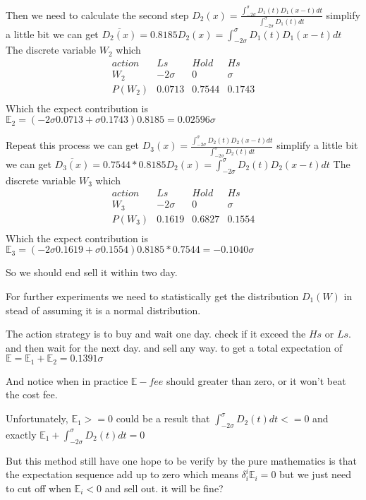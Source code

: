 \documentclass{article}
\theoremstyle{definition} %
\begin{document}
Then we need to calculate the second step
$D_2(x)=
    \frac{\int_{-2\sigma}^{\sigma}D_1(t)D_1(x-t)dt}
    {\int_{-2\sigma}^{\sigma}D_1(t)dt}$
simplify a little bit we can get
$\overline{D_2(x)}=0.8185D_2(x)=
    \int_{-2\sigma}^{\sigma}D_1(t)D_1(x-t)dt$
The discrete variable $W_2$ which
$$
    \begin{array}{c|ccc}
        action & Ls       & Hold   & Hs     \\
        W_2    & -2\sigma & 0      & \sigma \\
        \hline
        P(W_2) & 0.0713   & 0.7544 & 0.1743 \\
    \end{array}
$$
Which the expect contribution is
$\mathbb{E}_2
    =(-2\sigma0.0713+\sigma0.1743)0.8185
    =0.02596\sigma$

Repeat this process we can get
$D_3(x)=
    \frac{\int_{-2\sigma}^{\sigma}D_2(t)D_2(x-t)dt}
    {\int_{-2\sigma}^{\sigma}D_2(t)dt}$
simplify a little bit we can get
$\overline{D_3(x)}=0.7544*0.8185D_2(x)=
    \int_{-2\sigma}^{\sigma}D_2(t)D_2(x-t)dt$
The discrete variable $W_3$ which
$$
    \begin{array}{c|ccc}
        action & Ls       & Hold   & Hs     \\
        W_3    & -2\sigma & 0      & \sigma \\
        \hline
        P(W_3) & 0.1619   & 0.6827 & 0.1554 \\
    \end{array}
$$
Which the expect contribution is
$\mathbb{E}_3
    =(-2\sigma0.1619+\sigma0.1554)0.8185*0.7544
    =-0.1040\sigma$

So we should end sell it within two day.

For further experiments we need to statistically
get the distribution $D_1(W)$ in stead of
assuming it is a normal distribution.

The action strategy is to buy and wait one day.
check if it exceed the $Hs$ or $Ls$.
and then wait for the next day.
and sell any way.
to get a total expectation of
$\mathbb{E}
    =\mathbb{E}_1+\mathbb{E}_2
    =0.1391\sigma$

And notice when in practice
$\mathbb{E}-fee$ should greater than zero, or
it won't beat the cost fee.

Unfortunately,
$\mathbb{E}_1>=0$
could be a result that
$\int_{-2\sigma}^{\sigma}D_2(t)dt<=0$
and
exactly
$\mathbb{E}_1+\int_{-2\sigma}^{\sigma}D_2(t)dt=0$

But this method still have one hope to be
verify by the pure mathematics
is that
the expectation sequence
add up to zero
which means
$\delta_i^i\mathbb{E}_i=0$
but we just need to cut off when
$\mathbb{E}_i<0$ and sell out. it will be fine?
\end{document}
